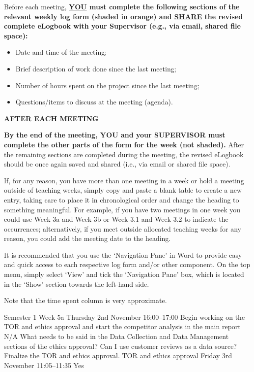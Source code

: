 \documentclass[../CHEFCookingHelper.tex]{subfiles}
\begin{document}
Before each meeting, \textbf{\ul{YOU} must complete the following sections of the relevant weekly log form
(\colorbox{\logbookshadecolour}{shaded in orange}) and \ul{SHARE} the revised complete eLogbook with your Supervisor
(e.g., via email, shared file space):}

\begin{itemize}
    \item Date and time of the meeting;
    \item Brief description of work done since the last meeting;
    \item Number of hours spent on the project since the last meeting;
    \item Questions/items to discuss at the meeting (agenda).
\end{itemize}

\textbf{AFTER EACH MEETING}

\textbf{By the end of the meeting, YOU and your SUPERVISOR must complete the other parts of the form for the week
(not shaded).} After the remaining sections are completed during the meeting, the revised eLogbook should be once
again saved and shared (i.e., via email or shared file space).

If, for any reason, you have more than one meeting in a week or hold a meeting outside of teaching weeks,
simply copy and paste a blank table to create a new entry, taking care to place it in chronological order and
change the heading to something meaningful. For example, if you have two meetings in one week you could use
Week 3a and Week 3b or Week 3.1 and Week 3.2 to indicate the occurrences; alternatively, if you meet outside
allocated teaching weeks for any reason, you could add the meeting date to the heading.

It is recommended that you use the \enquote*{Navigation Pane} in Word to provide easy and quick access to each respective
log form and/or other component.  On the top menu, simply select \enquote*{View} and tick the \enquote*{Navigation Pane} box, which
is located in the \enquote*{Show} section towards the left-hand side.

Note that the time spent column is very approximate.

\logbookentry
{Semester 1 Week 5a}
{Thursday 2nd November 16:00--17:00}
{Begin working on the TOR and ethics approval and start the competitor analysis in the main report}
{N/A}
{What needs to be said in the Data Collection and Data Management sections of the ethics approval? Can I use customer reviews as a data source?}
{Finalize the TOR and ethics approval.}
{TOR and ethics approval}
{Friday 3rd November 11:05--11:35}
{Yes}
\end{document}
